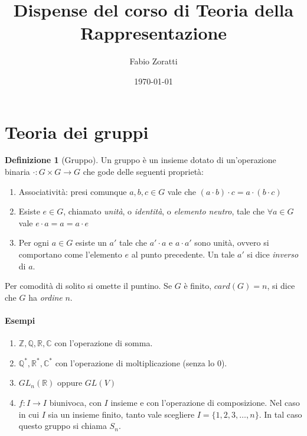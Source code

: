 \documentclass[11pt]{article}
\title{Dispense del corso di Teoria della Rappresentazione}
\author{Fabio Zoratti}
\date{\today}
\theoremstyle{plain}
\theoremstyle{definition}
\newtheorem{defn}{Definizione}[section]
\theoremstyle{remark}
\begin{document}
\maketitle
\tableofcontents



\newpage
\section{Teoria dei gruppi}

\begin{defn}[Gruppo] Un gruppo è un insieme dotato di un'operazione binaria $\cdot : G\times G \to G$ che gode delle seguenti proprietà:
\begin{enumerate}
	\item Associatività: presi comunque $a,b,c\in G$ vale che $(a\cdot b)\cdot c = a\cdot(b\cdot c)$
	\item Esiste $e\in G$, chiamato \emph{unità}, o \emph{identità}, o \emph{elemento neutro}, tale che $\forall a\in G$ vale $e\cdot a = a = a\cdot e$
	\item Per ogni $a\in G$ esiste un $a'$ tale che $a'\cdot a$ e $a\cdot a'$ sono unità, ovvero si comportano come l'elemento $e$ al punto precedente.
		  Un tale $a'$ si dice \emph{inverso} di $a$.
\end{enumerate}
Per comodità di solito si omette il puntino. Se $G$ è finito, $card(G) = n$, si dice che $G$ ha \emph{ordine} $n$.
\end{defn}

\paragraph{Esempi}
\begin{enumerate}
	\item $\mathbb{Z}, \mathbb{Q}, \mathbb{R}, \mathbb{C}$ con l'operazione di somma.
	\item $\mathbb{Q}^*, \mathbb{R}^*, \mathbb{C}^*$ con l'operazione di moltiplicazione (senza lo 0).
	\item $GL_n(\mathbb{R})$ oppure $GL(V)$
	\item $f:I\to I $ biunivoca, con $I$ insieme e con l'operazione di composizione. Nel caso in cui $I$ sia un insieme finito, tanto vale scegliere $I = \{1,2,3,\ldots, n\}$. In tal caso questo gruppo si chiama $S_n$.
\end{enumerate}
\end{document}
